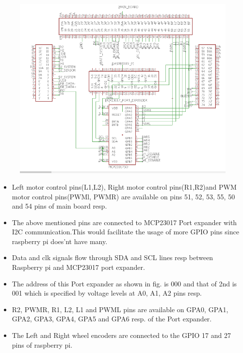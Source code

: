 \documentclass[a4paper,12pt,oneside]{book}
\begin{document}
\section*{\textbf{\fontsize{25}{10}\selectfont{8.Motors and wheel encoders interface}}}
\begin{figure}[h]
	\includegraphics[width=1\textwidth]{wheels}
\end{figure}
\hfill
\begin{itemize}
	\item {Left motor control pins(L1,L2), Right motor control pins(R1,R2)and PWM motor control pins(PWMl, PWMR) are available on pins 51, 52, 53, 55, 50 and 54 pins of main board resp.}
	\item {The above mentioned pins are connected to MCP23017 Port expander with I2C communication.This would facilitate the usage of more GPIO pins since raspberry pi does'nt have many.}
	\item {Data and clk signals flow through SDA and SCL lines resp between Raspberry pi and MCP23017 port expander.}
	\item {The address of this Port expander as shown in fig. is 000 and that of 2nd is 001 which is specified by voltage levels at A0, A1, A2 pins resp.}
	\item {R2, PWMR, R1, L2, L1 and PWML pins are available on GPA0, GPA1, GPA2, GPA3, GPA4, GPA5 and GPA6 resp. of the Port expander.}
   	\item {The Left and Right wheel encoders are connected to the GPIO 17 and 27 pins of raspberry pi.}
\end{itemize}
\pagebreak
\end{document}
